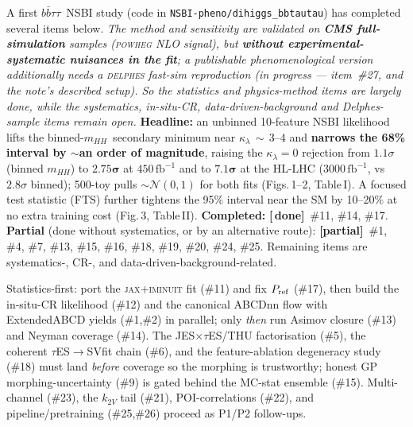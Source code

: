 \documentclass[11pt]{article}
\newcommand{\kl}{\ensuremath{\kappa_\lambda}}
\newcommand{\mhh}{\ensuremath{m_{HH}}}
\newcommand{\bbtt}{\ensuremath{b\bar b\tau\tau}}
\newcommand{\stDone}{\textcolor{green!50!black}{\textbf{[\checkmark\,done]}}}
\newcommand{\stPart}{\textcolor{orange!90!black}{\textbf{[partial]}}}
\begin{document}
\begin{keybox}
{\small A first \bbtt\ NSBI study (code in \texttt{NSBI-pheno/dihiggs\_bbtautau}) has completed several items
below. \emph{The method and sensitivity are validated on \textbf{CMS full-simulation} samples (\textsc{powheg} NLO
signal), but \textbf{without experimental-systematic nuisances in the fit}; a publishable phenomenological version
additionally needs a \textsc{delphes} fast-sim reproduction (in progress --- item~\#27, and the note's described
setup). So the statistics and physics-method items are largely done, while the systematics, in-situ-CR,
data-driven-background and Delphes-sample items remain open.} \textbf{Headline:} an unbinned 10-feature NSBI likelihood
lifts the binned-\mhh\ secondary minimum near \kl$\,\sim\,$3--4 and \textbf{narrows the 68\% interval by
$\sim$an order of magnitude}, raising the \kl$=0$ rejection from $1.1\sigma$ (binned \mhh) to $\mathbf{2.75\sigma}$
at $450\,\mathrm{fb}^{-1}$ and to $\mathbf{7.1\sigma}$ at the HL-LHC ($3000\,\mathrm{fb}^{-1}$, vs $2.8\sigma$
binned); 500-toy pulls $\sim\mathcal N(0,1)$ for both fits (Figs.\,1--2, Table\,I). A focused test statistic (FTS)
further tightens the 95\% interval near the SM by 10--20\% at no extra training cost (Fig.\,3, Table\,II).
\textbf{Completed:} \stDone\ \#11, \#14, \#17. \textbf{Partial} (done without systematics, or by an alternative
route): \stPart\ \#1, \#4, \#7, \#13, \#15, \#16, \#18, \#19, \#20, \#24, \#25. Remaining items are systematics-,
CR-, and data-driven-background-related.}
\end{keybox}

\begin{keybox}
{\small Statistics-first: port the \textsc{jax}+\textsc{iminuit} fit (\#11) and fix $P_{\rm ref}$ (\#17), then build
the in-situ-CR likelihood (\#12) and the canonical ABCDnn flow with ExtendedABCD yields (\#1,\#2) in parallel; only
\emph{then} run Asimov closure (\#13) and Neyman coverage (\#14). The JES$\times\tau$ES/THU factorisation (\#5),
the coherent $\tau$ES$\to$SVfit chain (\#6), and the feature-ablation degeneracy study (\#18) must land
\emph{before} coverage so the morphing is trustworthy; honest GP morphing-uncertainty (\#9) is gated behind the
MC-stat ensemble (\#15). Multi-channel (\#23), the $k_{2V}$ tail (\#21), POI-correlations (\#22), and
pipeline/pretraining (\#25,\#26) proceed as P1/P2 follow-ups.}
\end{keybox}
\end{document}
